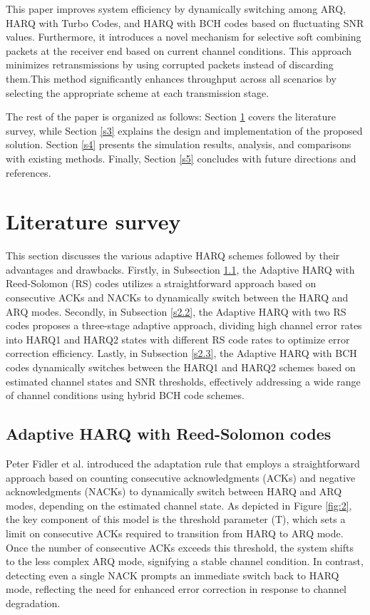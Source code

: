 \documentclass[sn-mathphys-num]{sn-jnl}
\theoremstyle{thmstyleone}
\theoremstyle{thmstyletwo}%
\theoremstyle{thmstylethree}%
\begin{document}
This paper improves system efficiency by dynamically switching among ARQ, HARQ with Turbo Codes, and HARQ with BCH codes based on fluctuating SNR values. Furthermore, it introduces a novel mechanism for selective soft combining packets at the receiver end based on current channel conditions. This approach minimizes retransmissions by using corrupted packets instead of discarding them.This method significantly enhances throughput across all scenarios by selecting the appropriate scheme at each transmission stage.

The rest of the paper is organized as follows: Section \ref{s2} covers the literature survey, while Section \ref{s3} explains the design and implementation of the proposed solution. Section \ref{s4} presents the simulation results, analysis, and comparisons with existing methods. Finally, Section \ref{s5} concludes with future directions and references.

\section{Literature survey} \label{s2}

This section discusses the various adaptive HARQ schemes followed by their advantages and drawbacks. Firstly, in Subsection \ref{s2.1}, the Adaptive HARQ with Reed-Solomon (RS) codes utilizes a straightforward approach based on consecutive ACKs and NACKs to dynamically switch between the HARQ and ARQ modes. Secondly, in Subsection \ref{s2.2}, the Adaptive HARQ with two RS codes proposes a three-stage adaptive approach, dividing high channel error rates into HARQ1 and HARQ2 states with different RS code rates to optimize error correction efficiency. Lastly, in Subsection \ref{s2.3}, the Adaptive HARQ with BCH codes dynamically switches between the HARQ1 and HARQ2 schemes based on estimated channel states and SNR thresholds, effectively addressing a wide range of channel conditions using hybrid BCH code schemes. 

\subsection{Adaptive HARQ with Reed-Solomon codes} \label{s2.1}

Peter Fidler et al. \cite{r6} introduced the adaptation rule that employs a straightforward approach based on counting consecutive acknowledgments (ACKs) and negative acknowledgments (NACKs) to dynamically switch between HARQ and ARQ modes, depending on the estimated channel state. As depicted in Figure \ref{fig:2}, the key component of this model is the threshold parameter (T), which sets a limit on consecutive ACKs required to transition from HARQ to ARQ mode. Once the number of consecutive ACKs exceeds this threshold, the system shifts to the less complex ARQ mode, signifying a stable channel condition. In contrast, detecting even a single NACK prompts an immediate switch back to HARQ mode, reflecting the need for enhanced error correction in response to channel degradation.
\end{document}
